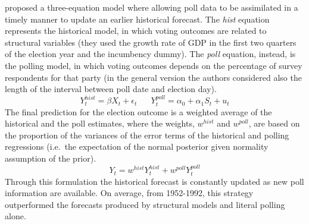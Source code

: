 \documentclass[
  12pt]{article}
\begin{document}
\citet{bro:cha:1999} proposed a three-equation model where allowing poll
data to be assimilated in a timely manner to update an earlier
historical forecast. The \emph{hist} equation represents the historical
model, in which voting outcomes are related to structural variables
(they used the growth rate of GDP in the first two quarters of the
election year and the incumbency dummy). The \emph{poll} equation,
instead, is the polling model, in which voting outcomes depends on the
percentage of survey respondents for that party (in the general version
the authors considered also the length of the interval between poll date
and election day).
\[Y_{t}^{hist} = \beta X_t + \epsilon_t \;\;\;\;\;\; Y_{t}^{poll} = \alpha_0 + \alpha_1 S_t + u_t\]
The final prediction for the election outcome is a weighted average of
the historical and the poll estimates, where the weights, \(w^{hist}\)
and \(w^{poll}\), are based on the proportion of the variances of the
error terms of the historical and polling regressions (i.e.~the
expectation of the normal posterior given normality assumption of the
prior). \[Y_{t} =  w^{hist} Y_{t}^{hist} + w^{poll} Y_{t}^{poll}\]
Through this formulation the historical forecast is constantly updated
as new poll information are available. On average, from 1952-1992, this
strategy outperformed the forecasts produced by structural models and
literal polling alone.
\end{document}
